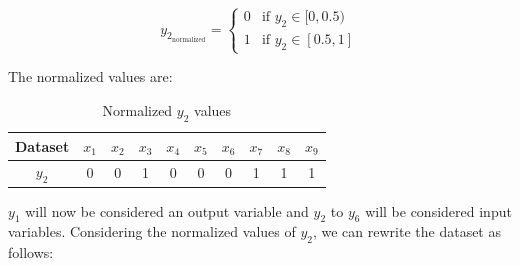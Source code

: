 \documentclass{article}
\begin{document}
\[ y_{2_{\text{normalized}}} = \begin{cases}
  0 & \text{if } y_2 \in [0, 0.5) \\
  1 & \text{if } y_2 \in [0.5, 1]
\end{cases} \]

The normalized values are:

\begin{table}[H]
\centering
\begin{tabular}{|c|c|c|c|c|c|c|c|c|c|}
  \hline
  Dataset & $x_1$ & $x_2$ & $x_3$ & $x_4$ & $x_5$ & $x_6$ & $x_7$ & $x_8$ & $x_9$ \\ \hline
  $y_2$ & 0 & 0 & 1 & 0 & 0 & 0 & 1 & 1 & 1 \\ \hline
\end{tabular}
\label{tab:dataset2}
\caption{Normalized $y_2$ values}
\end{table}

$y_1$ will now be considered an output variable and $y_2$ to $y_6$ will be considered input variables.
Considering the normalized values of $y_2$, we can rewrite the dataset as follows:
\end{document}
